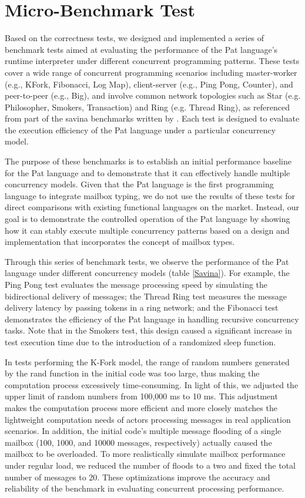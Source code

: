 \documentclass{l4proj}
\begin{document}
\section{Micro-Benchmark Test}

Based on the correctness tests, we designed and implemented a series of benchmark tests aimed at evaluating the performance of the Pat language's runtime interpreter under different concurrent programming patterns. These tests cover a wide range of concurrent programming scenarios including master-worker (e.g., KFork, Fibonacci, Log Map), client-server (e.g., Ping Pong, Counter), and peer-to-peer (e.g., Big), and involve common network topologies such as Star (e.g. Philosopher, Smokers, Transaction) and Ring (e.g. Thread Ring), as referenced from part of the savina benchmarks written by \cite{imam_2014_savina}. Each test is designed to evaluate the execution efficiency of the Pat language under a particular concurrency model.

The purpose of these benchmarks is to establish an initial performance baseline for the Pat language and to demonstrate that it can effectively handle multiple concurrency models. Given that the Pat language is the first programming language to integrate mailbox typing, we do not use the results of these tests for direct comparisons with existing functional languages on the market. Instead, our goal is to demonstrate the controlled operation of the Pat language by showing how it can stably execute multiple concurrency patterns based on a design and implementation that incorporates the concept of mailbox types.

Through this series of benchmark tests, we observe the performance of the Pat language under different concurrency models (table \ref{Savina}). For example, the Ping Pong test evaluates the message processing speed by simulating the bidirectional delivery of messages; the Thread Ring test measures the message delivery latency by passing tokens in a ring network; and the Fibonacci test demonstrates the efficiency of the Pat language in handling recursive concurrency tasks. Note that in the Smokers test, this design caused a significant increase in test execution time due to the introduction of a randomized sleep function.

In tests performing the K-Fork model, the range of random numbers generated by the rand function in the initial code was too large, thus making the computation process excessively time-consuming. In light of this, we adjusted the upper limit of random numbers from 100,000 ms to 10 ms. This adjustment makes the computation process more efficient and more closely matches the lightweight computation needs of actors processing messages in real application scenarios. In addition, the initial code's multiple message flooding of a single mailbox (100, 1000, and 10000 messages, respectively) actually caused the mailbox to be overloaded. To more realistically simulate mailbox performance under regular load, we reduced the number of floods to a two and fixed the total number of messages to 20. These optimizations improve the accuracy and reliability of the benchmark in evaluating concurrent processing performance.
\end{document}
